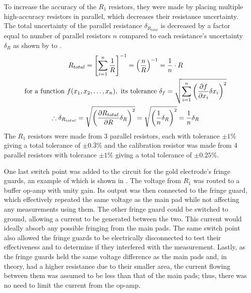 To increase the accuracy of the $R_1$ resistors, they were made by placing multiple high-accuracy resistors in parallel, which decreases their resistance uncertainty.
The total uncertainty of the parallel resistance $\delta_{R_{total}}$ is decreased by a factor equal to number of parallel resistors $n$ compared to each resistance's uncertainty $\delta_R$ as shown by  to .
\begin{gather}
 R_{total} = {\left[ \sum_{i=1}^{n} \frac{\displaystyle 1}{\displaystyle R} \right]}^{-1} = {\left(\frac{\displaystyle n}{\displaystyle R}\right)}^{-1} = \frac{\displaystyle 1}{\displaystyle n}\cdot R \label{eqn:parallel-resistor-total} \\
 \text{for a function}~f(x_1,x_2,\dots,x_n),~\text{its tolerance} ~\delta_f = \sqrt{\sum_{i=1}^{n} {\left( \frac{\displaystyle \partial f}{\displaystyle \partial x_i} \delta x_i \right)}^2} \label{eqn:uncertainty-general-formula} \\
    \therefore \delta_{R_{total}} = \sqrt{{\left( \frac{\displaystyle \partial R_{total}}{\displaystyle \partial R} \delta_R \right)}^2} = \sqrt{{\left( \frac{\displaystyle 1}{\displaystyle n} \delta_R \right)}^2} = \frac{\displaystyle 1}{\displaystyle n} \delta_R \label{eqn:parallel-resistor-uncertainty}
\end{gather}
The $R_1$ resistors were made from 3 parallel resistors, each with tolerance $\pm1\%$ giving a total tolerance of $\pm0.\bar{3}\%$ and the calibration resistor was made from 4 parallel resistors with tolerance $\pm1\%$ giving a total tolerance of $\pm0.25\%$.

One last switch point was added to the circuit for the gold electrode's fringe guards, an example of which is shown in .
The voltage from $R_1$ was routed to a buffer op-amp with unity gain. 
Its output was then connected to the fringe guard, which effectively repeated the same voltage as the main pad while not affecting any measurements using them.
The other fringe guard could be switched to ground, allowing a current to be generated between the two. 
This current would ideally absorb any possible fringing from the main pads.
The same switch point also allowed the fringe guards to be electrically disconnected to test their effectiveness and to determine if they interfered with the measurement.
Lastly, as the fringe guards held the same voltage difference as the main pads and, in theory, had a higher resistance due to their smaller area, the current flowing between them was assumed to be less than that of the main pads; thus, there was no need to limit the current from the op-amp.

